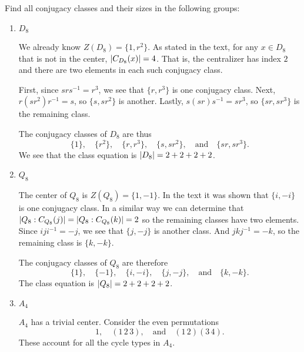 \label{exercise:group-actions:conj-classes-D8-Q8-A4}
Find all conjugacy classes and their sizes in the following
groups:
\begin{enumerate}
\item $D_8$
  \begin{solution}
    We already know $Z(D_8) = \{1, r^2\}$. As stated in the text, for
    any $x\in D_8$ that is not in the center, $\lvert{C_{D_8}(x)}\rvert =
    4$. That is, the centralizer has index $2$ and there are two
    elements in each such conjugacy class.

    First, since $srs^{-1} = r^3$, we see that $\{r, r^3\}$ is one
    conjugacy class. Next, $r(sr^2)r^{-1} = s$, so $\{s, sr^2\}$ is
    another. Lastly, $s(sr)s^{-1} = sr^3$, so $\{sr, sr^3\}$ is the
    remaining class.

    The conjugacy classes of $D_8$ are thus
    \begin{equation*}
      \{1\}, \quad
      \{r^2\}, \quad
      \{r, r^3\}, \quad
      \{s, sr^2\}, \quad\text{and}\quad
      \{sr, sr^3\}.
    \end{equation*}
    We see that the class equation is $\lvert{D_8}\rvert = 2 + 2 + 2 + 2$.
  \end{solution}

\item $Q_8$
  \begin{solution}
    The center of $Q_8$ is $Z(Q_8) = \{1, -1\}$. In the text it was
    shown that $\{i, -i\}$ is one conjugacy class. In a similar way we
    can determine that
    $\lvert{Q_8: C_{Q_8}(j)}\rvert = \lvert{Q_8: C_{Q_8}(k)}\rvert = 2$ so the
    remaining classes have two elements. Since $iji^{-1} = -j$, we see
    that $\{j, -j\}$ is another class. And $jkj^{-1} = -k$, so the
    remaining class is $\{k, -k\}$.

    The conjugacy classes of $Q_8$ are therefore
    \begin{equation*}
      \{1\}, \quad
      \{-1\}, \quad
      \{i, -i\}, \quad
      \{j, -j\}, \quad\text{and}\quad
      \{k, -k\}.
    \end{equation*}
    The class equation is $\lvert{Q_8}\rvert = 2 + 2 + 2 + 2$.
  \end{solution}

\item $A_4$
  \begin{solution}
    $A_4$ has a trivial center. Consider the even permutations
    \begin{equation*}
      1, \quad
      (1\,2\,3), \quad\text{and}\quad
      (1\,2)(3\,4).
    \end{equation*}
    These account for all the cycle types in $A_4$.


\end{solution}
\end{enumerate}
